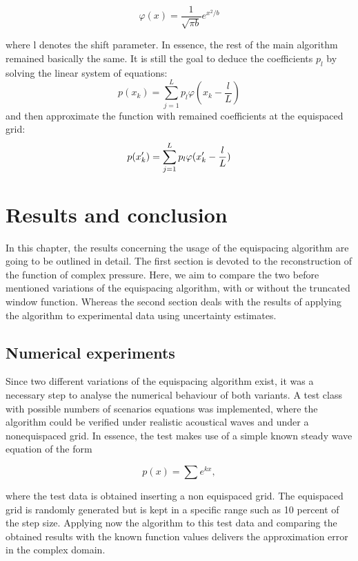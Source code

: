 \documentclass[11pt]{report} %
\begin{document}
\begin{equation}
\varphi(x)= \frac{1}{\sqrt{\pi b}}  e^{x^2/b}
\end{equation}

where l denotes the shift parameter.
In essence, the rest of the main algorithm remained basically the same.
It is still the goal to deduce the coefficients $p_{l}$ by solving the linear system of equations: 
\begin{equation}
p(x_{k})=\sum\limits_{j=1}^L p_{l}\varphi(x_{k}-\frac{l}{L})
\end{equation}
and then approximate the function with remained coefficients at the equispaced grid: 
\begin{equation}
p(x'_{k})= \sum\limits_{j=1}^L p_{l}\varphi(x'_{k}-\frac{l}{L}) \notag
\end{equation}


\chapter{Results and conclusion}
\label{chap:ResultsConclusion}
In this chapter, the results concerning the usage of the equispacing algorithm are going to be outlined in detail. 
The first section is devoted to the reconstruction of the function of complex pressure.
Here, we aim to compare the two before mentioned variations of the equispacing algorithm, with or without the truncated window function. 
Whereas the second section deals with the results of applying the algorithm to experimental data using uncertainty estimates. 
 
\section{Numerical experiments}
Since two different variations of the equispacing algorithm exist, it was a necessary step to analyse the numerical behaviour of both variants.
A test class with possible numbers of scenarios equations was implemented, where the  
algorithm could be verified under realistic acoustical waves and under a nonequispaced grid.
In essence, the test makes use of a simple known steady wave equation of the form

\begin{equation}
p(x)= \sum e^{kx},
\end{equation}

where the test data is obtained inserting a non equispaced grid. 
The equispaced grid is randomly generated but is kept in a specific range such as 10 percent of the step size. 
Applying now the algorithm to this test data and comparing the obtained results with the known function values delivers the approximation error in the complex domain.
\end{document}
